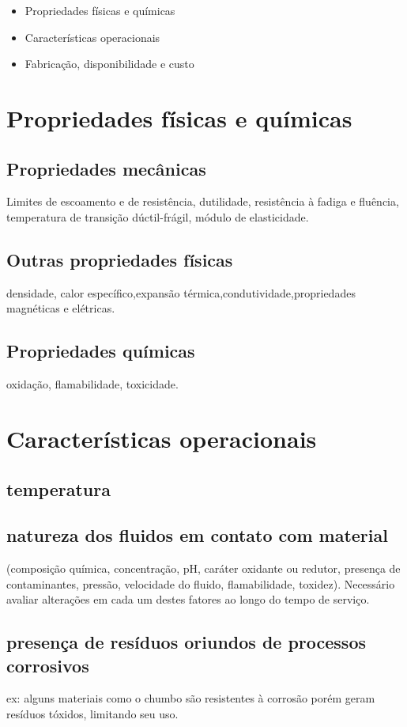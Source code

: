 \begin{itemize}
	\item Propriedades físicas e químicas 
	\item Características operacionais
	\item Fabricação, disponibilidade e custo
	
\end{itemize}


\section{Propriedades físicas e químicas}

\subsection*{Propriedades mecânicas}
Limites de escoamento e de resistência, dutilidade, resistência à fadiga e fluência, temperatura de transição dúctil-frágil, módulo de elasticidade.

\subsection{Outras propriedades físicas}
densidade, calor específico,expansão térmica,condutividade,propriedades magnéticas e elétricas.


\subsection*{Propriedades químicas}
oxidação, flamabilidade, toxicidade.

\section{Características operacionais}

\subsection*{temperatura}
\subsection*{natureza dos fluidos em contato com material}
(composição química, concentração, pH, caráter oxidante ou redutor, presença de contaminantes, pressão, velocidade do fluido, flamabilidade, toxidez). Necessário avaliar alterações em cada um destes fatores ao longo do tempo de serviço.

\subsection*{presença de resíduos oriundos de processos corrosivos}
ex: alguns materiais como o chumbo são resistentes à corrosão porém geram resíduos tóxidos, limitando seu uso.


